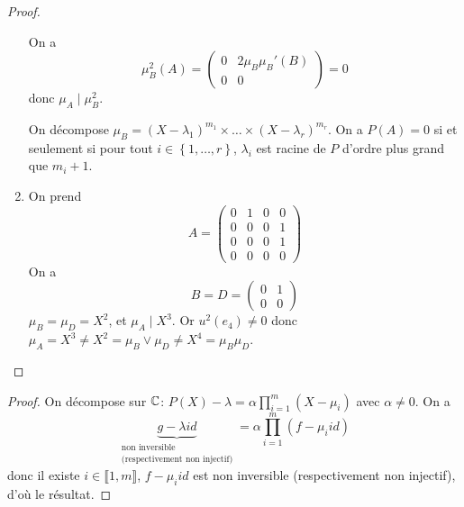 \documentclass[12pt]{article}
\begin{document}
\begin{proof}
\begin{enumerate}
		On a 
		\begin{equation}
			\mu_{B}^{2}(A)=\begin{pmatrix}
				0&2\mu_{B}\mu_{B}'(B)\\
				0&0
			\end{pmatrix}=0
		\end{equation}
		donc $\mu_{A}\mid\mu_{B}^{2}$.

		On décompose $\mu_{B}=(X-\lambda_{1})^{m_{1}}\times\dots\times(X-\lambda_{r})^{m_{r}}$. On a $P(A)=0$ si et seulement si pour tout $i\in\left\lbrace1,\dots,r\right\rbrace$, $\lambda_{i}$ est racine de $P$ d'ordre plus grand que $m_{i}+1$.

		\item On prend 
		\begin{equation}
			A=\begin{pmatrix}
				0&1&0&0\\
				0&0&0&1\\
				0&0&0&1\\
				0&0&0&0
			\end{pmatrix}
		\end{equation}
		On a 
		\begin{equation}
			B=D=\begin{pmatrix}
				0&1\\0&0
			\end{pmatrix}
		\end{equation}
		$\mu_{B}=\mu_{D}=X^{2}$, et $\mu_{A}\mid X^{3}$. Or $u^{2}(e_{4})\neq0$ donc $\mu_{A}=X^{3}\neq X^{2}=\mu_{B}\vee\mu_{D}\neq X^{4}=\mu_{B}\mu_{D}$.
	\end{enumerate}
\end{proof}

\begin{proof}
	On décompose sur $\mathbb{C}$: $P(X)-\lambda=\alpha\prod_{i=1}^{m}(X-\mu_{i})$ avec $\alpha\neq0$. On a 
	\begin{equation}
		\underbrace{g-\lambda id}_{\substack{\text{non inversible}\\\text{(respectivement non injectif)}}}=\alpha\prod_{i=1}^{m}(f-\mu_{i}id)
	\end{equation}
	donc il existe $i\in\llbracket1,m\rrbracket$, $f-\mu_{i}id$ est non inversible (respectivement non injectif), d'où le résultat.
\end{proof}
\end{document}
